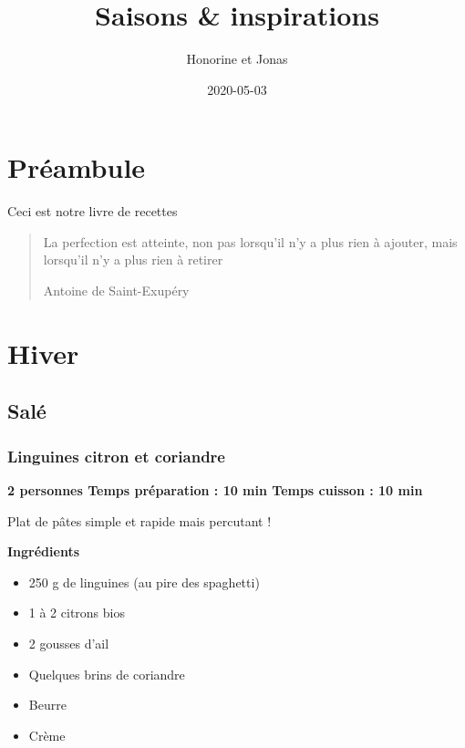 \documentclass[]{book}
\title{Saisons \& inspirations}
\author{Honorine et Jonas}
\date{2020-05-03}
\providecommand{\tightlist}{%
  \setlength{\itemsep}{0pt}\setlength{\parskip}{0pt}}
\begin{document}
\maketitle

{
\setcounter{tocdepth}{1}
\tableofcontents
}
\hypertarget{Pruxe9ambule}{%
\chapter*{Préambule}\label{Pruxe9ambule}}

Ceci est notre livre de recettes

\begin{quote}
La perfection est atteinte, non pas lorsqu'il n'y a plus rien à ajouter, mais lorsqu'il n'y a plus rien à retirer

Antoine de Saint-Exupéry
\end{quote}

\hypertarget{hiver}{%
\chapter*{Hiver}\label{hiver}}

\hypertarget{saluxe9}{%
\section*{Salé}\label{saluxe9}}

\hypertarget{linguines-citron-et-coriandre}{%
\subsection*{\texorpdfstring{{Linguines citron et coriandre}}{Linguines citron et coriandre}}\label{linguines-citron-et-coriandre}}

\begin{salebox}
\textbf{2 personnes \textbar{} Temps préparation : 10 min \textbar{}
Temps cuisson : 10 min}

Plat de pâtes simple et rapide mais percutant !
\end{salebox}

\textbf{Ingrédients}

\begin{itemize}
\tightlist
\item
  250 g de linguines (au pire des spaghetti)
\item
  1 à 2 citrons bios
\item
  2 gousses d'ail
\item
  Quelques brins de coriandre
\item
  Beurre
\item
  Crème
\end{itemize}
\end{document}
